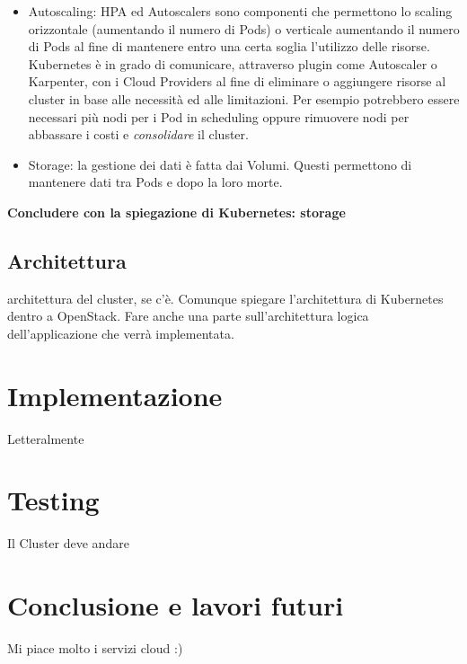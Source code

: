 \begin{itemize}
{        E' sempre necessario un Ingress Controller (come AKS, NginX o altri) per applicare le regole di routing.
    }
    \item {
        Autoscaling: HPA ed Autoscalers sono componenti che permettono lo scaling orizzontale (aumentando il numero di Pods) o verticale aumentando il numero di Pods al fine di mantenere entro una certa soglia l'utilizzo delle risorse.\\
        Kubernetes è in grado di comunicare, attraverso plugin come Autoscaler o Karpenter, con i Cloud Providers al fine di eliminare o aggiungere risorse al cluster in base alle necessità ed alle limitazioni. Per esempio potrebbero essere necessari più nodi per i Pod in scheduling oppure rimuovere nodi per abbassare i costi e \textit{consolidare} il cluster.
    }
    \item {
        Storage: la gestione dei dati è fatta dai Volumi. Questi permettono di mantenere dati tra Pods e dopo la loro morte. 
    }
\end{itemize}
\textbf{Concludere con la spiegazione di Kubernetes: storage}
%
\section{Architettura}
\label{sec:arch}
architettura del cluster, se c'è. Comunque spiegare l'architettura di Kubernetes dentro a OpenStack. 
Fare anche una parte sull'architettura logica dell'applicazione che verrà implementata.
%
\chapter{Implementazione}
Letteralmente
%
\chapter{Testing}
Il Cluster deve andare
%
\chapter{Conclusione e lavori futuri}
Mi piace molto i servizi cloud :)
